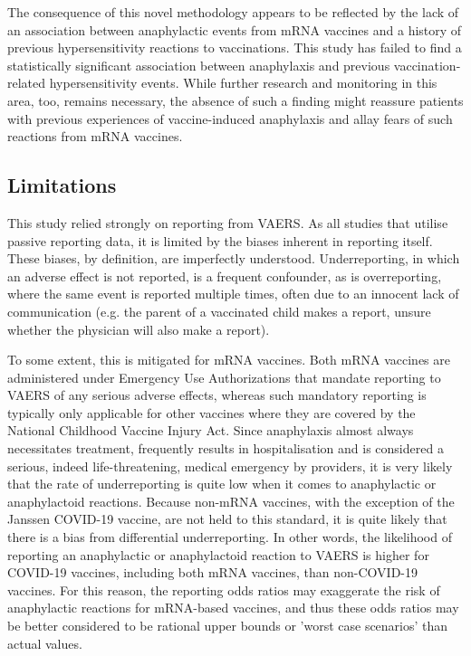 \documentclass{article}
\begin{document}
The consequence of this novel methodology appears to be reflected by the lack of an association between anaphylactic events from mRNA vaccines and a history of previous hypersensitivity reactions to vaccinations.
This study has failed to find a statistically significant association between anaphylaxis and previous vaccination-related hypersensitivity events.
While further research and monitoring in this area, too, remains necessary, the absence of such a finding might reassure patients with previous experiences of vaccine-induced anaphylaxis and allay fears of such reactions from mRNA vaccines.

\subsection{Limitations}

This study relied strongly on reporting from VAERS.
As all studies that utilise passive reporting data, it is limited by the biases inherent in reporting itself.
These biases, by definition, are imperfectly understood.\cite{singleton1999overview,shimabukuro2015safety,chen1994vaccine}
Underreporting, in which an adverse effect is not reported, is a frequent confounder, as is overreporting, where the same event is reported multiple times, often due to an innocent lack of communication (e.g. the parent of a vaccinated child makes a report, unsure whether the physician will also make a report).

To some extent, this is mitigated for mRNA vaccines.
Both mRNA vaccines are administered under Emergency Use Authorizations that mandate reporting to VAERS of any serious adverse effects, whereas such mandatory reporting is typically only applicable for other vaccines where they are covered by the National Childhood Vaccine Injury Act.
Since anaphylaxis almost always necessitates treatment, frequently results in hospitalisation and is considered a serious, indeed life-threatening, medical emergency by providers, it is very likely that the rate of underreporting is quite low when it comes to anaphylactic or anaphylactoid reactions.
Because non-mRNA vaccines, with the exception of the Janssen COVID-19 vaccine, are not held to this standard, it is quite likely that there is a bias from differential underreporting.
In other words, the likelihood of reporting an anaphylactic or anaphylactoid reaction to VAERS is higher for COVID-19 vaccines, including both mRNA vaccines, than non-COVID-19 vaccines.
For this reason, the reporting odds ratios may exaggerate the risk of anaphylactic reactions for mRNA-based vaccines, and thus these odds ratios may be better considered to be rational upper bounds or 'worst case scenarios' than actual values.
\end{document}
